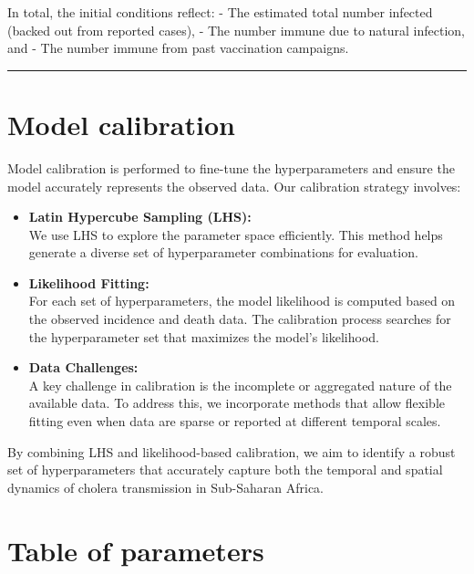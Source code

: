\documentclass[
]{book}
\begin{document}
In total, the initial conditions reflect:
- The estimated total number infected (backed out from reported cases),
- The number immune due to natural infection, and
- The number immune from past vaccination campaigns.

\begin{center}\rule{0.5\linewidth}{0.5pt}\end{center}

\section{Model calibration}\label{model-calibration}

Model calibration is performed to fine-tune the hyperparameters and ensure the model accurately represents the observed data. Our calibration strategy involves:

\begin{itemize}
\item
  \textbf{Latin Hypercube Sampling (LHS):}\\
  We use LHS to explore the parameter space efficiently. This method helps generate a diverse set of hyperparameter combinations for evaluation.
\item
  \textbf{Likelihood Fitting:}\\
  For each set of hyperparameters, the model likelihood is computed based on the observed incidence and death data. The calibration process searches for the hyperparameter set that maximizes the model's likelihood.
\item
  \textbf{Data Challenges:}\\
  A key challenge in calibration is the incomplete or aggregated nature of the available data. To address this, we incorporate methods that allow flexible fitting even when data are sparse or reported at different temporal scales.
\end{itemize}

By combining LHS and likelihood-based calibration, we aim to identify a robust set of hyperparameters that accurately capture both the temporal and spatial dynamics of cholera transmission in Sub-Saharan Africa.

\section{Table of parameters}\label{table-of-parameters}
\end{document}
